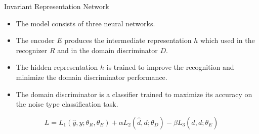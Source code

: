 \documentclass[final]{beamer}
\newlength{\onecolwid}
\newlength{\twocolwid}
\begin{document}
\begin{frame}[t]
\begin{columns}[t]
\begin{column}{\twocolwid}

    \begin{columns}[t]

        \begin{column}{\onecolwid} %
            \begin{block}{{\Large Invariant Representation Network}}
                \begin{itemize}
                    \item The model consists of three neural networks. 
                    \item The encoder $E$ produces
                        the intermediate representation $h$ which used in the recognizer $R$ and 
                        in the domain discriminator $D$. 
                    \item The hidden representation $h$ is trained to improve
                        the recognition and minimize the domain discriminator performance. 
                    \item The domain discriminator
                        is a classifier trained to maximize its accuracy on the noise type
                        classification task.
                \end{itemize}
                \begin{equation*}
                    L = L_1(\hat{y}, y; \theta_R, \theta_E) + 
                    \alpha L_2(\hat{d}, d; \theta_D) -
                    \beta L_3(\hat{d}, d; \theta_E)
                \end{equation*}


\end{block}
\end{column}
\end{columns}
\end{column}
\end{columns}
\end{frame}
\end{document}
